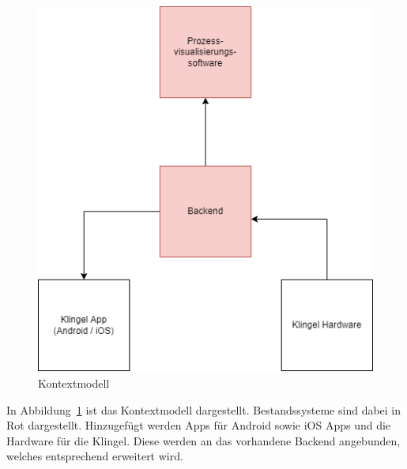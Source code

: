 \begin{figure}[ht!]
    \centering\includegraphics[width=\paperwidth/2]{../assets/img/kontextmodell}

    \caption{Kontextmodell}
    \label{fig:kontextmodell}
\end{figure}
In Abbildung~\ref{fig:kontextmodell} ist das Kontextmodell dargestellt.
Bestandssysteme sind dabei in Rot dargestellt.
Hinzugefügt werden Apps für Android sowie iOS Apps und die Hardware für die Klingel.
Diese werden an das vorhandene Backend angebunden, welches entsprechend erweitert wird.